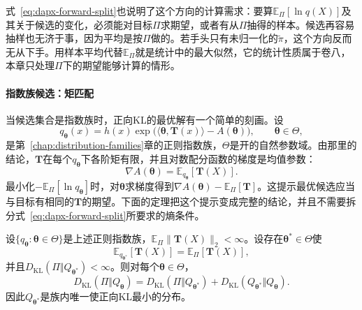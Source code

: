 式~\eqref{eq:dapx-forward-split}也说明了这个方向的计算需求：要算$\mathbb{E}_{\Pi}[\ln q(X)]$及其关于候选的变化，必须能对目标$\Pi$求期望，或者有从$\Pi$抽得的样本。候选再容易抽样也无济于事，因为平均是按$\Pi$做的。若手头只有未归一化的$\widetilde{\pi}$，这个方向反而无从下手。用样本平均代替$\mathbb{E}_{\Pi}$就是统计中的最大似然，它的统计性质属于卷八，本章只处理$\Pi$下的期望能够计算的情形。

\paragraph{指数族候选：矩匹配}
当候选集合是指数族时，正向KL的最优解有一个简单的刻画。设
\[
 q_{\bm{\theta}}(x)=h(x)\exp\bigl(\langle\bm{\theta},\bm{T}(x)\rangle-A(\bm{\theta})\bigr),\qquad \bm{\theta}\in\Theta ,
\]
是第~\ref{chap:distribution-families}章的正则指数族，$\Theta$是开的自然参数域。由那里的结论，$\bm{T}$在每个$q_{\bm{\theta}}$下各阶矩有限，并且对数配分函数的梯度是均值参数：
\[
 \nabla A(\bm{\theta})=\mathbb{E}_{q_{\bm{\theta}}}[\bm{T}(X)] .
\]
最小化$-\mathbb{E}_{\Pi}[\ln q_{\bm{\theta}}]$时，对$\bm{\theta}$求梯度得到$\nabla A(\bm{\theta})-\mathbb{E}_{\Pi}[\bm{T}]$。这提示最优候选应当与目标有相同的$\bm{T}$的期望。下面的定理把这个提示变成完整的结论，并且不需要拆分式~\eqref{eq:dapx-forward-split}所要求的熵条件。

\begin{theorem}[正向KL与矩匹配]
\label{thm:dapx-moment-matching}
设$\{q_{\bm{\theta}}:\bm{\theta}\in\Theta\}$是上述正则指数族，$\mathbb{E}_{\Pi}\lVert\bm{T}(X)\rVert_2<\infty$。设存在$\bm{\theta}^{*}\in\Theta$使
\begin{equation}
 \mathbb{E}_{q_{\bm{\theta}^{*}}}[\bm{T}(X)]=\mathbb{E}_{\Pi}[\bm{T}(X)] ,
 \label{eq:dapx-moment-match}
\end{equation}
并且$D_{\mathrm{KL}}(\Pi\Vert Q_{\bm{\theta}^{*}})<\infty$。则对每个$\bm{\theta}\in\Theta$，
\begin{equation}
 D_{\mathrm{KL}}(\Pi\Vert Q_{\bm{\theta}})=D_{\mathrm{KL}}(\Pi\Vert Q_{\bm{\theta}^{*}})+D_{\mathrm{KL}}(Q_{\bm{\theta}^{*}}\Vert Q_{\bm{\theta}}) .
 \label{eq:dapx-pythagoras}
\end{equation}
因此$Q_{\bm{\theta}^{*}}$是族内唯一使正向KL最小的分布。
\end{theorem}

